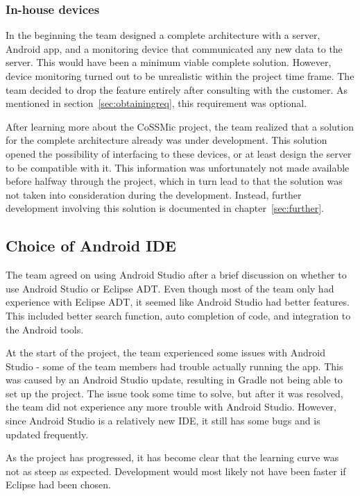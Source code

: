\subsubsection{In-house devices}
In the beginning the team designed a complete architecture with a server, Android app, and a monitoring device that communicated any new data to the server. This would have been a minimum viable complete solution. However, device monitoring turned out to be unrealistic within the project time frame. The team decided to drop the feature entirely after consulting with the customer. As mentioned in section~\ref{sec:obtainingreq}, this requirement was optional.

After learning more about the CoSSMic project, the team realized that a solution for the complete architecture already was under development. This solution opened the possibility of interfacing to these devices, or at least design the server to be compatible with it. This information was unfortunately not made available before halfway through the project, which in turn lead to that the solution was not taken into consideration during the development. Instead, further development involving this solution is documented in chapter~\ref{sec:further}.

\subsection{Choice of Android IDE}
The team agreed on using Android Studio after a brief discussion on whether to use Android Studio or Eclipse ADT. Even though most of the team only had experience with Eclipse ADT, it seemed like Android Studio had better features. This included  better search function, auto completion of code, and integration to the Android tools.
 
At the start of the project, the team experienced some issues with Android Studio - some of the team members had trouble actually running the app. This was caused by an Android Studio update, resulting in Gradle not being able to set up the project. The issue took some time to solve, but after it was resolved, the team did not experience any more trouble with Android Studio. However, since Android Studio is a relatively new IDE, it still has some bugs and is updated frequently.

As the project has progressed, it has become clear that the learning curve was not as steep as expected. Development would most likely not have been faster if Eclipse had been chosen.

